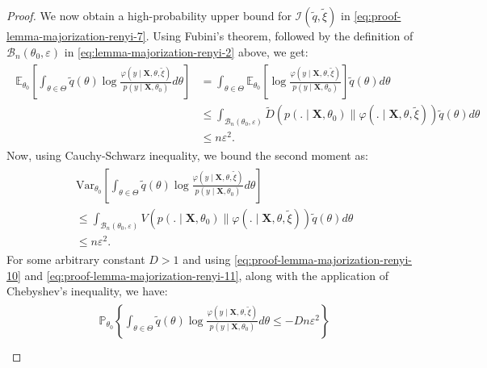 \documentclass[12pt]{article}
\numberwithin{equation}{section}
\begin{document}
\begin{proof}
We now obtain a high-probability upper bound for $\mathcal{I}(\tilde{q}, \tilde{\xi})$ in \eqref{eq:proof-lemma-majorization-renyi-7}. Using Fubini's theorem, followed by the definition of $\mathcal{B}_n(\theta_0, \varepsilon)$ in \eqref{eq:lemma-majorization-renyi-2} above, we get:
%
\begin{align}\label{eq:proof-lemma-majorization-renyi-10}
\begin{split}
    \mathbb{E}_{\theta_0}\left[\int_{\theta\in \Theta}\tilde{q}(\theta)\log\frac{\varphi(y\mid \mathbf{X}, \theta, \tilde{\xi})}{p(y\mid \mathbf{X}, \theta_0)}d\theta\right] &= 
    \int_{\theta\in \Theta} \mathbb{E}_{\theta_{0}}\left[\log\frac{\varphi(y \mid \mathbf{X}, \theta, \tilde{\xi})}{p(y\mid \mathbf{X}, \theta_{0})}\right]\tilde{q}(\theta)d\theta \\
    &\leq \int_{\mathcal{B}_{n}(\theta_{0}, \varepsilon)}\tilde{D}\left(p(.\mid \mathbf{X},\theta_0)\parallel \varphi(.\mid \mathbf{X}, \theta, \tilde{\xi})\right)\tilde{q}(\theta)d\theta\\
    &\leq n\varepsilon^2.
\end{split}
\end{align}
%
Now, using Cauchy-Schwarz inequality, we bound the second moment as:
\begin{align}\label{eq:proof-lemma-majorization-renyi-11}
    \begin{split}
        &\text{Var}_{\theta_{0}}\left[\int_{\theta\in \Theta} \tilde{q}(\theta)\log\frac{\varphi(y\mid \mathbf{X}, \theta, \tilde{\xi})}{p(y\mid \mathbf{X}, \theta_0)}d\theta\right]\\
        &\leq \int_{\mathcal{B}_{n}(\theta_{0}, \varepsilon)}V\left(p(.\mid \mathbf{X}, \theta_{0})\parallel \varphi(.\mid \mathbf{X}, \theta, \tilde{\xi})\right)\tilde{q}(\theta)d\theta \\&\leq n\varepsilon^2.
    \end{split}
\end{align}
For some arbitrary constant $D>1$ and using \eqref{eq:proof-lemma-majorization-renyi-10} and \eqref{eq:proof-lemma-majorization-renyi-11}, along with the application of Chebyshev's inequality, we have:
\begin{align}\label{eq:proof-lemma-majorization-renyi-12}
    \begin{split}
        &\mathbb{P}_{\theta_{0}}\left\{\int_{\theta\in \Theta} \tilde{q}(\theta)\log\frac{\varphi(y\mid \mathbf{X}, \theta, \tilde{\xi})}{p(y\mid \mathbf{X}, \theta_{0})}d\theta \leq -Dn\varepsilon^2\right\}\\

\end{split}
\end{align}
\end{proof}
\end{document}
